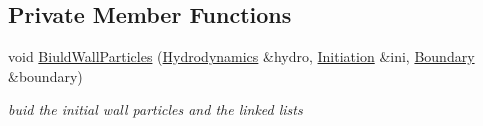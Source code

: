 \subsection*{Private Member Functions}
\begin{CompactItemize}
\item 
void \hyperlink{classParticleManager_edebb3e37b06426f6509b35c0926bd59}{BiuldWallParticles} (\hyperlink{classHydrodynamics}{Hydrodynamics} \&hydro, \hyperlink{classInitiation}{Initiation} \&ini, \hyperlink{classBoundary}{Boundary} \&boundary)
\begin{CompactList}\small\item\em buid the initial wall particles and the linked lists \item\end{CompactList}\end{CompactItemize}
